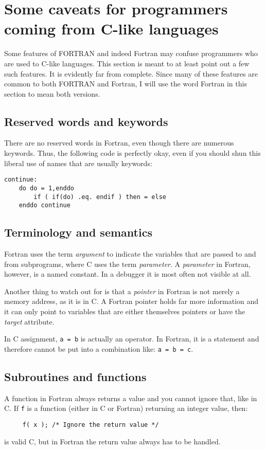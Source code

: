\section{Some caveats for programmers coming from C-like languages}

Some features of FORTRAN and indeed Fortran may confuse programmers who are used to C-like
languages. This section is meant to at least point out a few such features. It is evidently far
from complete. Since many of these features are common to both FORTRAN and Fortran, I will use the
word Fortran in this section to mean both versions.

\subsection{Reserved words and keywords}
There are no reserved words in Fortran, even though there are numerous keywords. Thus,
the following code is perfectly okay, even if you should shun this liberal use of names that
are usually keywords:

\begin{verbatim}
continue:
    do do = 1,enddo
        if ( if(do) .eq. endif ) then = else
    enddo continue
\end{verbatim}


\subsection{Terminology and semantics}
Fortran uses the term \emph{argument} to indicate the variables that are passed to and from
subprograms, where C uses the term \emph{parameter}. A \emph{parameter} in Fortran, however,
is a named constant. In a debugger it is most often not visible at all.

Another thing to watch out for is that a \emph{pointer} in Fortran is not merely a memory
address, as it is in C. A Fortran pointer holds far more information and it can only point
to variables that are either themselves pointers or have the \emph{target} attribute.

In C assignment, \verb+a = b+ is actually an operator. In Fortran, it is a statement and
therefore cannot be put into a combination like: \verb+a = b = c+.

\subsection{Subroutines and functions}
A function in Fortran always returns a value and you cannot ignore that, like in C. If \verb+f+
is a function (either in C or Fortran) returning an integer value, then:
\begin{verbatim}
     f( x ); /* Ignore the return value */
\end{verbatim}
\noindent is valid C, but in Fortran the return value always has to be handled.

